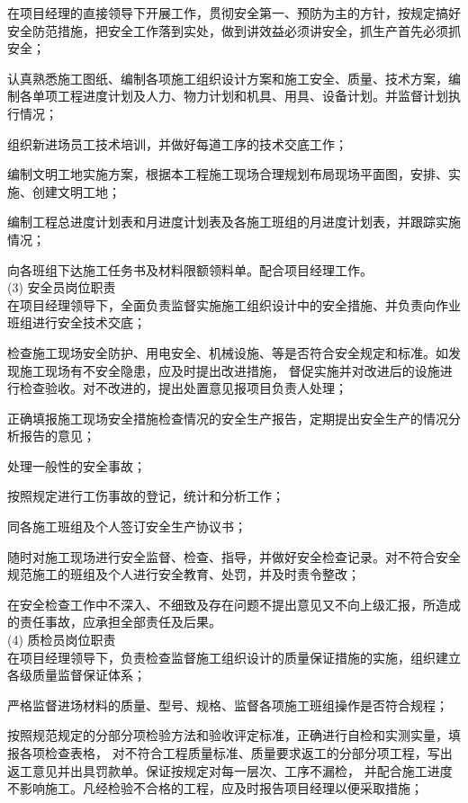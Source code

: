  在项目经理的直接领导下开展工作，贯彻安全第一、预防为主的方针，按规定搞好安全防范措施，把安全工作落到实处，做到讲效益必须讲安全，抓生产首先必须抓安全；

 认真熟悉施工图纸、编制各项施工组织设计方案和施工安全、质量、技术方案，编制各单项工程进度计划及人力、物力计划和机具、用具、设备计划。并监督计划执行情况；

 组织新进场员工技术培训，并做好每道工序的技术交底工作；

 编制文明工地实施方案，根据本工程施工现场合理规划布局现场平面图，安排、实施、创建文明工地；

 编制工程总进度计划表和月进度计划表及各施工班组的月进度计划表，并跟踪实施情况；

 向各班组下达施工任务书及材料限额领料单。配合项目经理工作。\\

(3) 安全员岗位职责\\

 在项目经理领导下，全面负责监督实施施工组织设计中的安全措施、并负责向作业班组进行安全技术交底；

 检查施工现场安全防护、用电安全、机械设施、等是否符合安全规定和标准。如发现施工现场有不安全隐患，应及时提出改进措施，
督促实施并对改进后的设施进行检查验收。对不改进的，提出处置意见报项目负责人处理；

 正确填报施工现场安全措施检查情况的安全生产报告，定期提出安全生产的情况分析报告的意见；

 处理一般性的安全事故；

 按照规定进行工伤事故的登记，统计和分析工作；

 同各施工班组及个人签订安全生产协议书；

 随时对施工现场进行安全监督、检查、指导，并做好安全检查记录。对不符合安全规范施工的班组及个人进行安全教育、处罚，并及时责令整改；

 在安全检查工作中不深入、不细致及存在问题不提出意见又不向上级汇报，所造成的责任事故，应承担全部责任及后果。\\

(4) 质检员岗位职责\\

 在项目经理领导下，负责检查监督施工组织设计的质量保证措施的实施，组织建立各级质量监督保证体系；

 严格监督进场材料的质量、型号、规格、监督各项施工班组操作是否符合规程；

 按照规范规定的分部分项检验方法和验收评定标准，正确进行自检和实测实量，填报各项检查表格，
对不符合工程质量标准、质量要求返工的分部分项工程，写出返工意见并出具罚款单。保证按规定对每一层次、工序不漏检，
并配合施工进度不影响施工。凡经检验不合格的工程，应及时报告项目经理以便采取措施；

